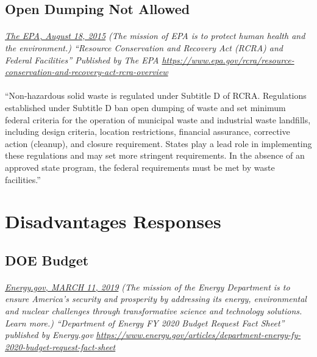 \documentclass{article}
\begin{document}
\subsection{Open Dumping Not Allowed}
\paragraph{}
\small
\textit{
\underline{The EPA, August 18, 2015}
(The mission of EPA is to protect human health and the environment.) “Resource Conservation and Recovery Act (RCRA) and Federal Facilities” Published by The EPA
\url{https://www.epa.gov/rcra/resource-conservation-and-recovery-act-rcra-overview}}
\normalsize

\paragraph{}
``Non-hazardous solid waste is regulated under Subtitle D of RCRA. Regulations established under Subtitle D ban open dumping of waste and set minimum federal criteria for the operation of municipal waste and industrial waste landfills, including design criteria,  location restrictions, financial assurance, corrective action (cleanup), and closure requirement. States play a lead role in implementing these regulations and may set more stringent requirements. In the absence of an approved state program, the federal requirements must be met by waste facilities.”

\section{Disadvantages Responses}

\subsection{DOE Budget}
\paragraph{}
\small
\textit{
\underline{Energy.gov, MARCH 11, 2019}
(The mission of the Energy Department is to ensure America’s security and prosperity by addressing its energy, environmental and nuclear challenges through transformative science and technology solutions. Learn more.) “Department of Energy FY 2020 Budget Request Fact Sheet” published by Energy.gov 
\url{https://www.energy.gov/articles/department-energy-fy-2020-budget-request-fact-sheet}}
\normalsize
\end{document}
